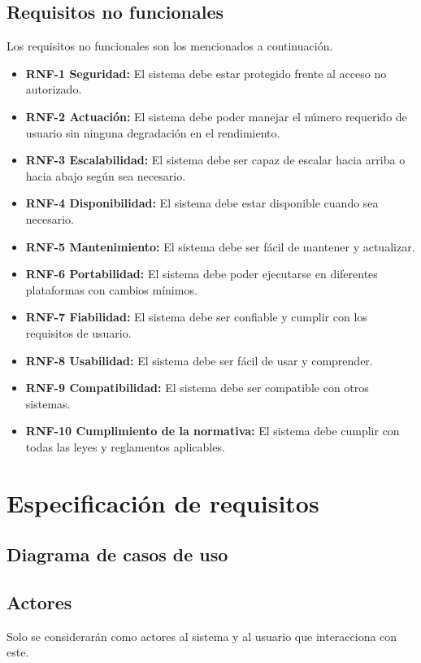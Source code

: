 \subsection{Requisitos no funcionales}
Los requisitos no funcionales son los mencionados a continuación\cite{visrure:rnf}.
\begin{itemize}
    \item \textbf{RNF-1 Seguridad: }El sistema debe estar protegido frente al acceso no autorizado.
    \item \textbf{RNF-2 Actuación: }El sistema debe poder manejar el número requerido de usuario sin ninguna degradación en el rendimiento.
    \item \textbf{RNF-3 Escalabilidad: }El sistema debe ser capaz de escalar hacia arriba o hacia abajo según sea necesario.
    \item \textbf{RNF-4 Disponibilidad: }El sistema debe estar disponible cuando sea necesario.
    \item \textbf{RNF-5 Mantenimiento: }El sistema debe ser fácil de mantener y actualizar.
    \item \textbf{RNF-6 Portabilidad: }El sistema debe poder ejecutarse en diferentes plataformas con cambios mínimos.
    \item \textbf{RNF-7 Fiabilidad: }El sistema debe ser confiable y cumplir con los requisitos de usuario.
    \item \textbf{RNF-8 Usabilidad: }El sistema debe ser fácil de usar y comprender.
    \item \textbf{RNF-9 Compatibilidad: }El sistema debe ser compatible con otros sistemas.
    \item \textbf{RNF-10 Cumplimiento de la normativa: }El sistema debe cumplir con todas las leyes y reglamentos aplicables.
\end{itemize}


\section{Especificación de requisitos}

\subsection{Diagrama de casos de uso}

\subsection{Actores}
Solo se considerarán como actores al sistema y al usuario que interacciona con este.

